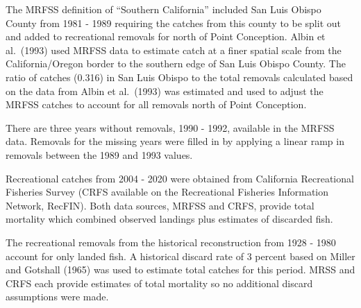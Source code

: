 \documentclass[11pt,
  english,
  a4paper,
]{article}
\begin{document}
\leavevmode\tagmcend\tagstructend\par


The MRFSS definition of ``Southern California'' included San Luis Obispo County from 1981 - 1989 requiring the catches from this county to be split out and added to recreational removals for north of Point Conception. Albin et al.~{(1993)\leavevmode\tagmcend\tagstructend} used MRFSS data to estimate catch at a finer spatial scale from the California/Oregon border to the southern edge of San Luis Obispo County. The ratio of catches (0.316) in San Luis Obispo to the total removals calculated based on the data from Albin et al.~{(1993)\leavevmode\tagmcend\tagstructend} was estimated and used to adjust the MRFSS catches to account for all removals north of Point Conception.

\leavevmode\tagmcend\tagstructend\par


There are three years without removals, 1990 - 1992, available in the MRFSS data. Removals for the missing years were filled in by applying a linear ramp in removals between the 1989 and 1993 values.

\leavevmode\tagmcend\tagstructend\par


Recreational catches from 2004 - 2020 were obtained from California Recreational Fisheries Survey (CRFS available on the Recreational Fisheries Information Network, RecFIN). Both data sources, MRFSS and CRFS, provide total mortality which combined observed landings plus estimates of discarded fish.

\leavevmode\tagmcend\tagstructend\par


The recreational removals from the historical reconstruction from 1928 - 1980 account for only landed fish. A historical discard rate of 3 percent based on Miller and Gotshall {(1965)\leavevmode\tagmcend\tagstructend} was used to estimate total catches for this period. MRSS and CRFS each provide estimates of total mortality so no additional discard assumptions were made.
\end{document}
